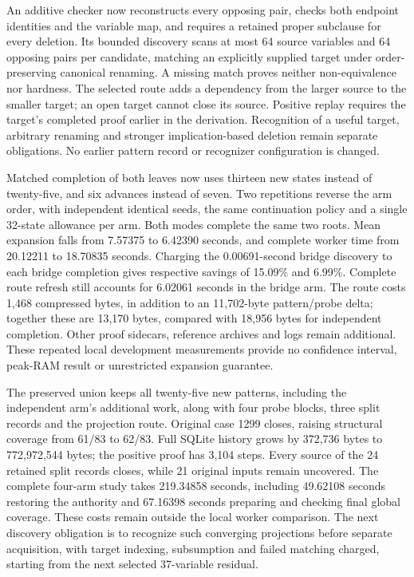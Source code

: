 \documentclass[11pt,a4paper]{article}
\numberwithin{equation}{section}
\theoremstyle{plain}
\theoremstyle{definition}
\theoremstyle{remark}
\begin{document}
An additive checker now reconstructs every opposing pair, checks both endpoint identities and the variable map, and requires a retained proper subclause for every deletion. Its bounded discovery scans at most 64 source variables and 64 opposing pairs per candidate, matching an explicitly supplied target under order-preserving canonical renaming. A missing match proves neither non-equivalence nor hardness. The selected route adds a dependency from the larger source to the smaller target; an open target cannot close its source. Positive replay requires the target's completed proof earlier in the derivation. Recognition of a useful target, arbitrary renaming and stronger implication-based deletion remain separate obligations. No earlier pattern record or recognizer configuration is changed.

Matched completion of both leaves now uses thirteen new states instead of twenty-five, and six advances instead of seven. Two repetitions reverse the arm order, with independent identical seeds, the same continuation policy and a single 32-state allowance per arm. Both modes complete the same two roots. Mean expansion falls from 7.57375 to 6.42390 seconds, and complete worker time from 20.12211 to 18.70835 seconds. Charging the 0.00691-second bridge discovery to each bridge completion gives respective savings of 15.09\% and 6.99\%. Complete route refresh still accounts for 6.02061 seconds in the bridge arm. The route costs 1,468 compressed bytes, in addition to an 11,702-byte pattern/probe delta; together these are 13,170 bytes, compared with 18,956 bytes for independent completion. Other proof sidecars, reference archives and logs remain additional. These repeated local development measurements provide no confidence interval, peak-RAM result or unrestricted expansion guarantee.

The preserved union keeps all twenty-five new patterns, including the independent arm's additional work, along with four probe blocks, three split records and the projection route. Original case 1299 closes, raising structural coverage from 61/83 to 62/83. Full SQLite history grows by 372,736 bytes to 772,972,544 bytes; the positive proof has 3,104 steps. Every source of the 24 retained split records closes, while 21 original inputs remain uncovered. The complete four-arm study takes 219.34858 seconds, including 49.62108 seconds restoring the authority and 67.16398 seconds preparing and checking final global coverage. These costs remain outside the local worker comparison. The next discovery obligation is to recognize such converging projections before separate acquisition, with target indexing, subsumption and failed matching charged, starting from the next selected 37-variable residual.
\end{document}

